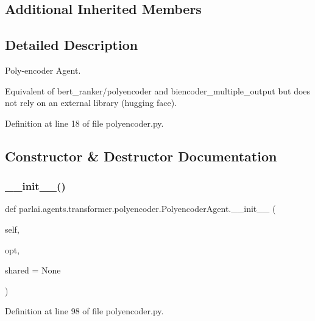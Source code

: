 \subsection*{Additional Inherited Members}


\subsection{Detailed Description}
\begin{DoxyVerb}Poly-encoder Agent.

Equivalent of bert_ranker/polyencoder and biencoder_multiple_output but does not
rely on an external library (hugging face).
\end{DoxyVerb}
 

Definition at line 18 of file polyencoder.\+py.



\subsection{Constructor \& Destructor Documentation}
\mbox{\label{classparlai_1_1agents_1_1transformer_1_1polyencoder_1_1PolyencoderAgent_a2e8f1aca19a3ba34386d7c69ed7e17bc}} 
\subsubsection{\texorpdfstring{\+\_\+\+\_\+init\+\_\+\+\_\+()}{\_\_init\_\_()}}
{\footnotesize\ttfamily def parlai.\+agents.\+transformer.\+polyencoder.\+Polyencoder\+Agent.\+\_\+\+\_\+init\+\_\+\+\_\+ (\begin{DoxyParamCaption}\item[{}]{self,  }\item[{}]{opt,  }\item[{}]{shared = {\ttfamily None} }\end{DoxyParamCaption})}



Definition at line 98 of file polyencoder.\+py.


